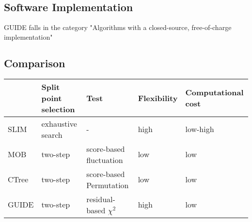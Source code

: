\subsection{Software Implementation}
GUIDE falls in the category "Algorithms with a closed-source, free-of-charge implementation" \citep{Loh.2014}

\subsection{Comparison}
\begin{table}[ht]
\centering
\begin{tabular}{lllll}
  \hline
 & Split point selection & Test & Flexibility & Computational cost  \\ 
  \hline
    SLIM & exhaustive search & - & high & low-high  \\ 
    MOB & two-step & score-based fluctuation & low & low  \\ 
    CTree & two-step & score-based Permutation & low & low  \\ 
    GUIDE & two-step & residual-based $\chi^2$  & high & low  \\ 
   \hline
\end{tabular}
\end{table}
\citep{Schlosser.2019}



